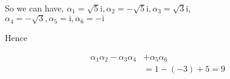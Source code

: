 \documentclass[10pt]{article}
\begin{document}
So we can have, \(\alpha_{1}=\sqrt{5} \mathrm{i}, \alpha_{2}=-\sqrt{5} \mathrm{i}, \alpha_{3}=\sqrt{3} \mathrm{i}\),\\
\(\alpha_{4}=-\sqrt{3}, \alpha_{5}=\mathrm{i}, \alpha_{6}=-\mathrm{i}\)

Hence

\[
\begin{aligned}
\alpha_{1} \alpha_{2}-\alpha_{3} \alpha_{4} & +\alpha_{5} \alpha_{6} \\
& =1-(-3)+5=9
\end{aligned}
\]
\end{document}
